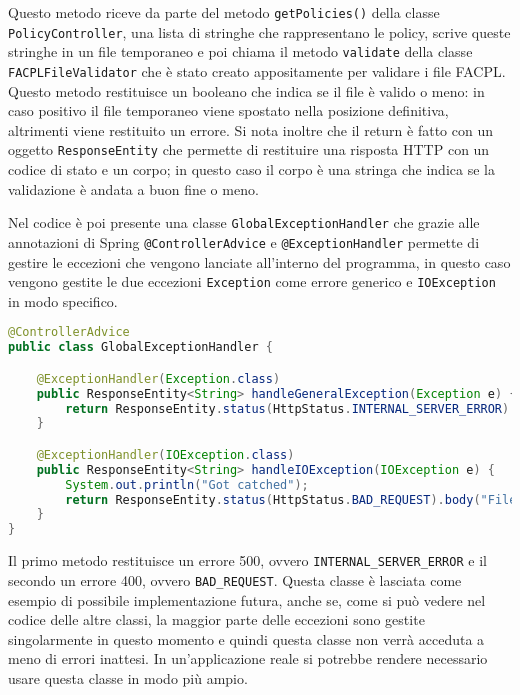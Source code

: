 Questo metodo riceve da parte del metodo \texttt{getPolicies()} della classe \texttt{PolicyController}, una lista di stringhe che rappresentano le policy, scrive queste stringhe in un file temporaneo e poi chiama il metodo \texttt{validate} della classe \texttt{FACPLFileValidator} che è stato creato appositamente per validare i file FACPL. Questo metodo restituisce un booleano che indica se il file è valido o meno: in caso positivo il file temporaneo viene spostato nella posizione definitiva, altrimenti viene restituito un errore. Si nota inoltre che il return è fatto con un oggetto \texttt{ResponseEntity} che permette di restituire una risposta HTTP con un codice di stato e un corpo; in questo caso il corpo è una stringa che indica se la validazione è andata a buon fine o meno.\par
Nel codice è poi presente una classe \texttt{GlobalExceptionHandler} che grazie alle annotazioni di Spring \texttt{@ControllerAdvice} e \texttt{@ExceptionHandler} permette di gestire le eccezioni che vengono lanciate all'interno del programma, in questo caso vengono gestite le due eccezioni \texttt{Exception} come errore generico e \texttt{IOException} in modo specifico.
\begin{lstlisting}[language=Java, caption=GlobalExceptionHandler, label=code:GlobalExceptionHandler, basicstyle=\fontsize{9.5}{11}\ttfamily]
@ControllerAdvice
public class GlobalExceptionHandler {

    @ExceptionHandler(Exception.class)
    public ResponseEntity<String> handleGeneralException(Exception e) {
        return ResponseEntity.status(HttpStatus.INTERNAL_SERVER_ERROR).body("An unexpected error occurred: " + e.getMessage());
    }

    @ExceptionHandler(IOException.class)
    public ResponseEntity<String> handleIOException(IOException e) {
    	System.out.println("Got catched");
        return ResponseEntity.status(HttpStatus.BAD_REQUEST).body("File processing error: " + e.getMessage());
    }
}
\end{lstlisting}
Il primo metodo restituisce un errore 500, ovvero \texttt{INTERNAL\_SERVER\_ERROR} e il secondo un errore 400, ovvero \texttt{BAD\_REQUEST}. Questa classe è lasciata come esempio di possibile implementazione futura, anche se, come si può vedere nel codice delle altre classi, la maggior parte delle eccezioni sono gestite singolarmente in questo momento e quindi questa classe non verrà acceduta a meno di errori inattesi. In un'applicazione reale si potrebbe rendere necessario usare questa classe in modo più ampio.

